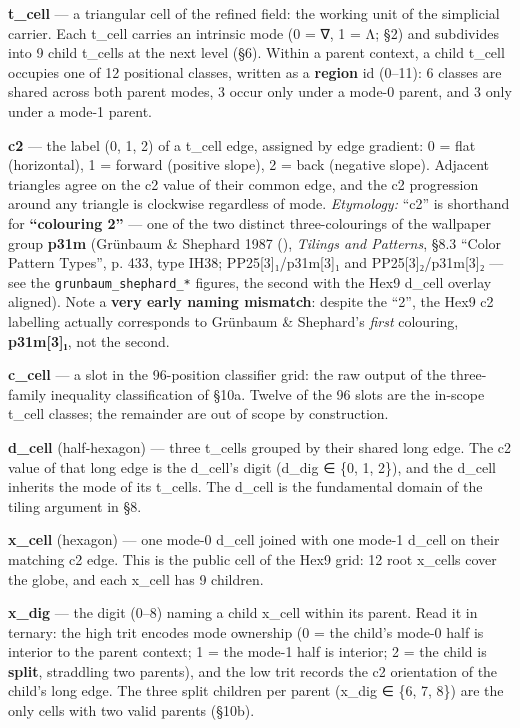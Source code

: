 \documentclass[
  11pt,
  a4paper,
]{article}
\begin{document}
\textbf{t\_cell} --- a triangular cell of the refined field: the working
unit of the simplicial carrier. Each t\_cell carries an intrinsic mode
(0 = ∇, 1 = Λ; §2) and subdivides into 9 child t\_cells at the next
level (§6). Within a parent context, a child t\_cell occupies one of 12
positional classes, written as a \textbf{region} id (0--11): 6 classes
are shared across both parent modes, 3 occur only under a mode-0 parent,
and 3 only under a mode-1 parent.

\textbf{c2} --- the label (0, 1, 2) of a t\_cell edge, assigned by edge
gradient: 0 = flat (horizontal), 1 = forward (positive slope), 2 = back
(negative slope). Adjacent triangles agree on the c2 value of their
common edge, and the c2 progression around any triangle is clockwise
regardless of mode. \emph{Etymology:} ``c2'' is shorthand for
\textbf{``colouring 2''} --- one of the two distinct three-colourings of
the wallpaper group \textbf{p31m} (Grünbaum \& Shephard 1987
(),
\emph{Tilings and Patterns}, §8.3 ``Color Pattern Types'', p. 433, type
IH38; PP25{[}3{]}₁/p31m{[}3{]}₁ and PP25{[}3{]}₂/p31m{[}3{]}₂ --- see
the \texttt{grunbaum\_shephard\_*} figures, the second with the Hex9
d\_cell overlay aligned). Note a \textbf{very early naming mismatch}:
despite the ``2'', the Hex9 c2 labelling actually corresponds to
Grünbaum \& Shephard's \emph{first} colouring, \textbf{p31m{[}3{]}₁},
not the second.

\textbf{c\_cell} --- a slot in the 96-position classifier grid: the raw
output of the three-family inequality classification of §10a. Twelve of
the 96 slots are the in-scope t\_cell classes; the remainder are out of
scope by construction.

\textbf{d\_cell} (half-hexagon) --- three t\_cells grouped by their
shared long edge. The c2 value of that long edge is the d\_cell's digit
(d\_dig ∈ \{0, 1, 2\}), and the d\_cell inherits the mode of its
t\_cells. The d\_cell is the fundamental domain of the tiling argument
in §8.

\textbf{x\_cell} (hexagon) --- one mode-0 d\_cell joined with one mode-1
d\_cell on their matching c2 edge. This is the public cell of the Hex9
grid: 12 root x\_cells cover the globe, and each x\_cell has 9 children.

\textbf{x\_dig} --- the digit (0--8) naming a child x\_cell within its
parent. Read it in ternary: the high trit encodes mode ownership (0 =
the child's mode-0 half is interior to the parent context; 1 = the
mode-1 half is interior; 2 = the child is \textbf{split}, straddling two
parents), and the low trit records the c2 orientation of the child's
long edge. The three split children per parent (x\_dig ∈ \{6, 7, 8\})
are the only cells with two valid parents (§10b).
\end{document}
